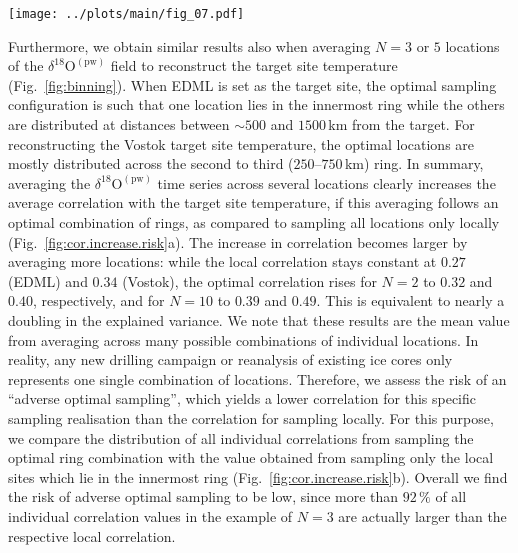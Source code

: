 \documentclass[cp, manuscript]{copernicus}
\begin{document}
\begin{figure*}[t]%
\centering
\texttt{[image: ../plots/main/fig\_07.pdf]}
\caption{%
  The optimal arrangement for averaging three or five
  $\delta^{18}\mathrm{O}^{\mathrm{(pw)}}$ ice cores to reconstruct the target
  site temperature at the EDML (\textbf{a}, \textbf{c}) and Vostok (\textbf{b},
  \textbf{d}) drilling sites. Displayed are subsets of the sampling correlation
  structures for $N=3$ and $5$, showing as black dots the optimal five of all
  possible combinations of rings, i.e., those which exhibit the highest mean
  correlation across $10^5$ random trials of averaging $N=3$ (\textbf{a},
  \textbf{b}) or $N=5$ (\textbf{c}, \textbf{d}) grid cells from these rings.}
\label{fig:binning}%
\end{figure*}%

Furthermore, we obtain similar results also when averaging $N=3$ or $5$
locations of the $\delta^{18}\mathrm{O}^{\mathrm{(pw)}}$ field to reconstruct
the target site temperature (Fig.~\ref{fig:binning}). When EDML is set as the
target site, the optimal sampling configuration is such that one location lies
in the innermost ring while the others are distributed at distances between
$\sim500$ and $1500$\,km from the target. For reconstructing the Vostok target
site temperature, the optimal locations are mostly distributed across the second
to third ($250$--$750$\,km) ring. In summary, averaging the
$\delta^{18}\mathrm{O}^{\mathrm{(pw)}}$ time series across several locations
clearly increases the average correlation with the target site temperature, if
this averaging follows an optimal combination of rings, as compared to sampling
all locations only locally (Fig.~\ref{fig:cor.increase.risk}a). The increase in
correlation becomes larger by averaging more locations: while the local
correlation stays constant at $0.27$ (EDML) and $0.34$ (Vostok), the optimal
correlation rises for $N=2$ to $0.32$ and $0.40$, respectively, and for $N=10$
to $0.39$ and $0.49$. This is equivalent to nearly a doubling in the explained
variance. We note that these results are the mean value from averaging across
many possible combinations of individual locations. In reality, any new drilling
campaign or reanalysis of existing ice cores only represents one single
combination of locations. Therefore, we assess the risk of an ``adverse optimal
sampling'', which yields a lower correlation for this specific sampling
realisation than the correlation for sampling locally. For this purpose, we
compare the distribution of all individual correlations from sampling the
optimal ring combination with the value obtained from sampling only the local
sites which lie in the innermost ring (Fig.~\ref{fig:cor.increase.risk}b).
Overall we find the risk of adverse optimal sampling to be low, since more than
$92\,\%$ of all individual correlation values in the example of $N=3$ are
actually larger than the respective local correlation.
\end{document}
